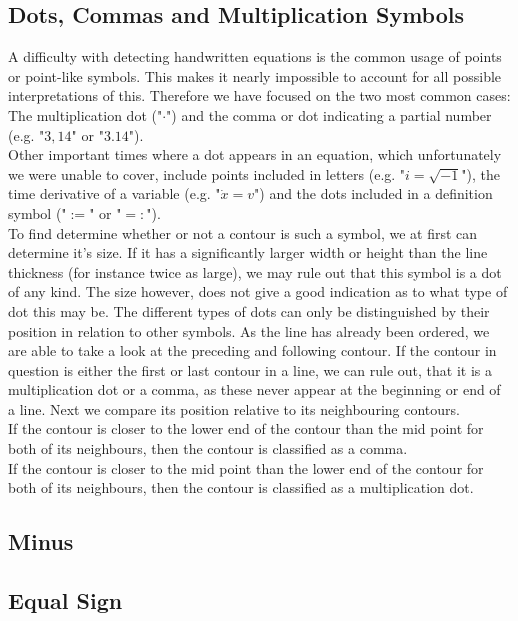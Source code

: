 \documentclass[12pt]{article}
\begin{document}
	\subsection{Dots, Commas and Multiplication Symbols}
	A difficulty with detecting handwritten equations is the common usage of points or point-like symbols.
	This makes it nearly impossible to account for all possible interpretations of this.
	Therefore we have focused on the two most common cases:
	The multiplication dot ("$\cdot$") and the comma or dot indicating a partial number (e.g. "$3,14$" or "$3.14$").\\
	Other important times where a dot appears in an equation, which unfortunately we were unable to cover, include points included in letters (e.g. "$i=\sqrt{-1}$"), the time derivative of a variable (e.g. "$\dot{x}=v$") and the dots included in a definition symbol ("$:=$" or "$=:$").\\  %
	To find determine whether or not a contour is such a symbol, we at first can determine it's size.
	If it has a significantly larger width or height than the line thickness (for instance twice as large), we may rule out that this symbol is a dot of any kind.
	The size however, does not give a good indication as to what type of dot this may be.
	The different types of dots can only be distinguished by their position in relation to other symbols.
	As the line has already been ordered, we are able to take a look at the preceding and following contour.
	If the contour in question is either the first or last contour in a line, we can rule out, that it is a multiplication dot or a comma, as these never appear at the beginning or end of a line.
	Next we compare its position relative to its neighbouring contours.\\
	If the contour is closer to the lower end of the contour than the mid point for both of its neighbours, then the contour is classified as a comma.\\
	
	If the contour is closer to the mid point than the lower end of the contour for both of its neighbours, then the contour is classified as a multiplication dot.\\
	
	
	\subsection{Minus}
	
	\subsection{Equal Sign}
	
\end{document}
